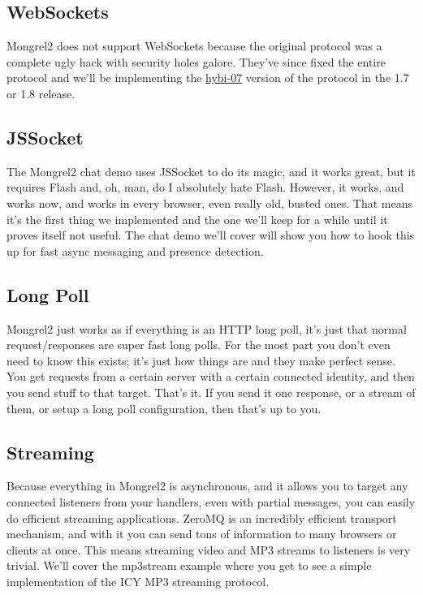 \subsection{WebSockets}

Mongrel2 does not support WebSockets because the original protocol was a complete
ugly hack with security holes galore.  They've since fixed the entire protocol
and we'll be implementing the \href{http://tools.ietf.org/html/draft-ietf-hybi-thewebsocketprotocol-07}{hybi-07}
version of the protocol in the 1.7 or 1.8 release.


\subsection{JSSocket}

The Mongrel2 chat demo uses JSSocket to do its magic, and it works great, but it requires
Flash and, oh, man, do I absolutely hate Flash.  However, it works, and works now, and works in every
browser, even really old, busted ones.  That means it's the first thing we implemented and
the one we'll keep for a while until it proves itself not useful.  The chat demo we'll
cover will show you how to hook this up for fast async messaging and presence detection.


\subsection{Long Poll}

Mongrel2 just works as if everything is an HTTP long poll, it's just that normal request/responses
are super fast long polls.  For the most part you don't even need to know this exists; it's just
how things are and they make perfect sense.  You get requests from a certain server with a
certain connected identity, and then you send stuff to that target.  That's it.  If you send it
one response, or a stream of them, or setup a long poll configuration, then that's up to you.


\subsection{Streaming}

Because everything in Mongrel2 is asynchronous, and it allows you to target any connected listeners
from your handlers, even with partial messages, you can easily do efficient streaming applications.  ZeroMQ
is an incredibly efficient transport mechanism, and with it you can send tons of information to many
browsers or clients at once.  This means streaming video and MP3 streams to listeners is very
trivial.  We'll cover the mp3stream example where you get to see a simple implementation of the ICY
MP3 streaming protocol.

